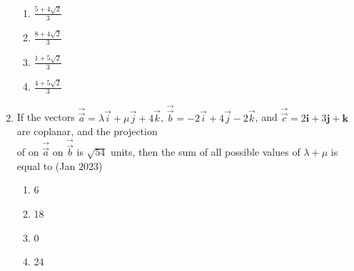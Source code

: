 \documentclass[journal,12pt,onecolumn]{IEEEtran}
\theoremstyle{remark}
\begin{document}
\begin{enumerate}
\begin{multicols}{2}
\begin{enumerate}
    \item $\frac{5 + 4\sqrt{2}}{3}$\\
    \item $\frac{8 + 4\sqrt{2}}{3}$
    \item $\frac{1 + 5\sqrt{2}}{3}$\\
    \item $\frac{4 + 5\sqrt{2}}{3}$\\
\end{enumerate}
\end{multicols}

\item If the vectors $\overrightarrow{\vec{a}} = \lambda\vec{i} + \mu\vec{j} + 4\vec{k}$, $\overrightarrow{\vec{b}} = -2\vec{i} + 4\vec{j} -2\vec{k}$, and  $\overrightarrow{\vec{c}} = 2\mathbf{i} + 3\mathbf{j} + \mathbf{k}$ are coplanar, and the projection\\ of  on $\overrightarrow{\vec{a}}$ on $\overrightarrow{\vec{b}}$ is $\sqrt{54}$ units, then the sum of all possible values of $\lambda + \mu$ is equal to \hfill(Jan 2023)
\begin{multicols}{4}
    \begin{enumerate}
    \item 6
    \item 18
    \item 0 
    \item 24
\end{enumerate}
\end{multicols}
\end{enumerate}
\end{document}
